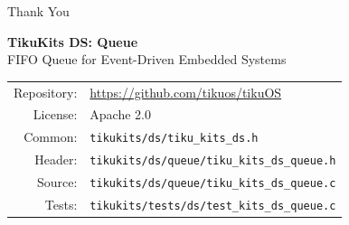\documentclass[aspectratio=169, 10pt]{beamer}
\begin{document}
\begin{frame}{Thank You}
\begin{center}
\Large\textbf{TikuKits DS: Queue}\\[0.5em]
\normalsize FIFO Queue for Event-Driven Embedded Systems\\[1.5em]

\begin{tabular}{rl}
  Repository: & \url{https://github.com/tikuos/tikuOS} \\
  License:    & Apache 2.0 \\
  Common:     & \texttt{tikukits/ds/tiku\_kits\_ds.h} \\
  Header:     & \texttt{tikukits/ds/queue/tiku\_kits\_ds\_queue.h} \\
  Source:     & \texttt{tikukits/ds/queue/tiku\_kits\_ds\_queue.c} \\
  Tests:      & \texttt{tikukits/tests/ds/test\_kits\_ds\_queue.c} \\
\end{tabular}
\end{center}
\end{frame}
\end{document}
